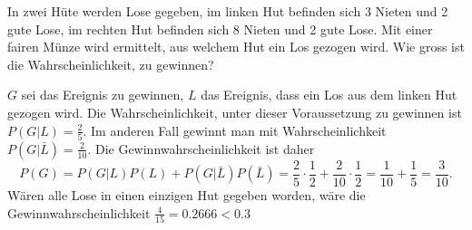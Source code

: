 In zwei Hüte werden Lose gegeben, im linken Hut befinden sich
3 Nieten  und 2 gute Lose, im rechten Hut befinden sich 8 Nieten
und 2 gute Lose. Mit einer fairen Münze wird ermittelt, aus welchem
Hut ein Los gezogen wird. Wie gross ist die Wahrscheinlichkeit, zu
gewinnen?

\begin{loesung}
$G$ sei das Ereignis zu gewinnen,
$L$ das Ereignis, dass ein Los aus dem linken Hut gezogen wird.
Die Wahrscheinlichkeit, unter dieser Voraussetzung zu gewinnen ist
$P(G|L)=\frac25$. Im anderen Fall gewinnt man mit Wahrscheinlichkeit
$P(G|\bar L)=\frac2{10}$. Die Gewinnwahrscheinlichkeit ist daher
$$P(G)=P(G|L)P(L)+P(G|\bar L)P(\bar L)=\frac25\cdot \frac12+\frac2{10}\cdot\frac12=\frac1{10}+\frac15=\frac3{10}.$$
Wären alle Lose in einen einzigen Hut gegeben worden, wäre die
Gewinnwahrscheinlichkeit $\frac{4}{15}=0.2666<0.3$
\end{loesung}

